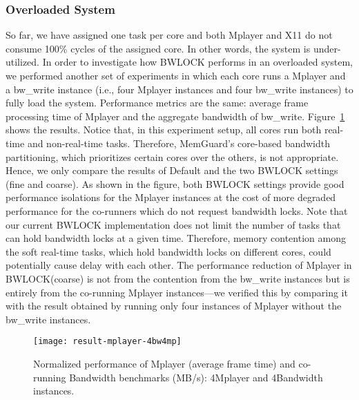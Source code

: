 \documentclass[times, 10pt,onecolumn]{article}
\begin{document}
\subsubsection{Overloaded System}
So far, we have assigned one task per core and both Mplayer and X11 do not
consume 100\% cycles of the assigned core. In other words, the system
is under-utilized. In order to investigate how BWLOCK performs in an
overloaded system, we performed another set of experiments in which
each core runs a Mplayer and a bw\_write instance (i.e., four Mplayer
instances and four bw\_write instances) to fully load the
system. Performance metrics are the same: average frame processing
time of Mplayer and the aggregate bandwidth of
bw\_write. Figure~\ref{fig:result-mplayer-4bw4mp} shows the
results. Notice that, in this experiment setup, all cores run both
real-time and non-real-time tasks. Therefore, MemGuard's core-based
bandwidth partitioning, which prioritizes certain cores over the
others, is not appropriate. Hence, we only compare the results of
Default and the two BWLOCK settings (fine and coarse). As shown in the
figure, both BWLOCK settings provide good performance isolations for
the Mplayer instances at the cost of more degraded performance for the
co-runners which do not request bandwidth locks. Note that our current
BWLOCK implementation does not limit the number of tasks that can hold
bandwidth locks at a given time. Therefore, memory contention among
the soft real-time tasks, which hold bandwidth locks on different
cores, could potentially cause delay with each other. The performance
reduction of Mplayer in BWLOCK(coarse) is not from the contention from
the bw\_write instances but is entirely from the co-running Mplayer
instances---we verified this by comparing it with the result obtained
by running only four instances of Mplayer without the bw\_write
instances.

\begin{figure}
\centering
\texttt{[image: result-mplayer-4bw4mp]}
\caption{Normalized performance of Mplayer (average frame time) and
co-running Bandwidth benchmarks (MB/s): 4Mplayer and 4Bandwidth instances.}
\label{fig:result-mplayer-4bw4mp}
\end{figure}
\end{document}
